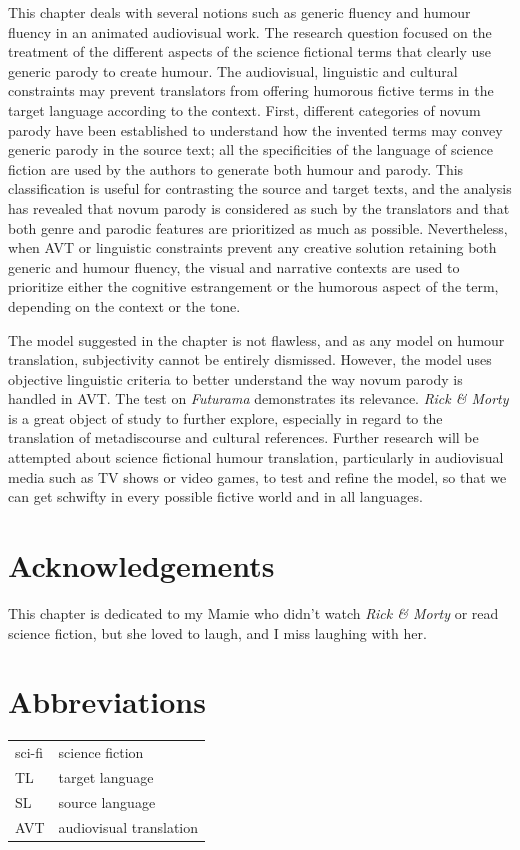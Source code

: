 \documentclass[output=paper]{langscibook}
\begin{document}
This chapter deals with several notions such as generic fluency and humour fluency in an animated audiovisual work. The research question focused on the treatment of the different aspects of the science fictional terms that clearly use generic parody to create humour. The audiovisual, linguistic and cultural constraints may prevent translators from offering humorous fictive terms in the target language according to the context. First, different categories of novum parody have been established to understand how the invented terms may convey generic parody in the source text; all the specificities of the language of science fiction are used by the authors to generate both humour and parody. This classification is useful for contrasting the source and target texts, and the analysis has revealed that novum parody is considered as such by the translators and that both genre and parodic features are prioritized as much as possible. Nevertheless, when AVT or linguistic constraints prevent any creative solution retaining both generic and humour fluency, the visual and narrative contexts are used to prioritize either the cognitive estrangement or the humorous aspect of the term, depending on the context or the tone.

The model suggested in the chapter is not flawless, and as any model on humour translation, subjectivity cannot be entirely dismissed. However, the model uses objective linguistic criteria to better understand the way novum parody is handled in AVT. The test on \textit{Futurama} demonstrates its relevance. \textit{Rick \& Morty} is a great object of study to further explore, especially in regard to the translation of metadiscourse and cultural references. Further research will be attempted about science fictional humour translation, particularly in audiovisual media such as TV shows or video games, to test and refine the model, so that we can get schwifty in every possible fictive world and in all languages.

\section*{Acknowledgements}

This chapter is dedicated to my Mamie who didn’t watch \textit{Rick \& Morty} or read science fiction, but she loved to laugh, and I miss laughing with her.

\section*{Abbreviations}

\begin{tabularx}{\textwidth}{lX}
sci-fi & science fiction\\
TL & target language\\
SL & source language\\
AVT & audiovisual translation\\
\end{tabularx}
\sloppy\printbibliography[heading=subbibliography,notkeyword=this]
\end{document}
